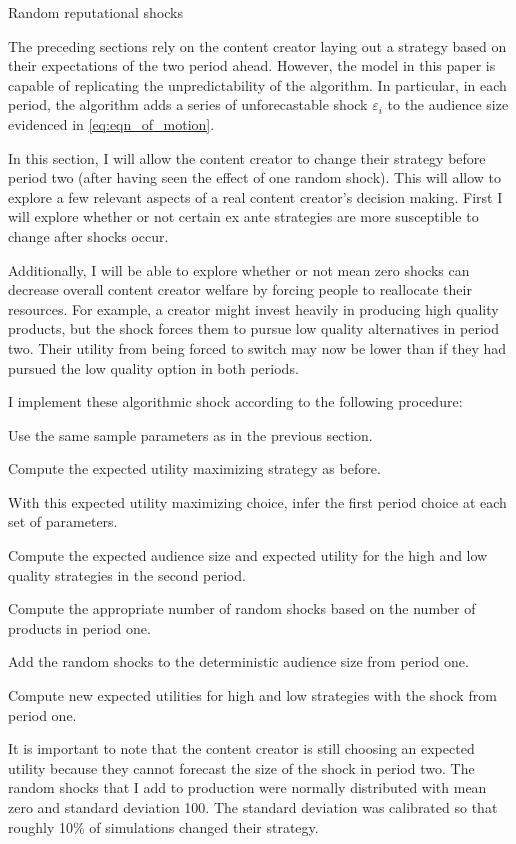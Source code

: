 \documentclass[
]{article}
\begin{document}
Random reputational shocks

The preceding sections rely on the content creator laying out a strategy
based on their expectations of the two period ahead. However, the model
in this paper is capable of replicating the unpredictability of the
algorithm. In particular, in each period, the algorithm adds a series of
unforecastable shock \(\varepsilon_i\) to the audience size evidenced in
\ref{eq:eqn_of_motion}.

In this section, I will allow the content creator to change their
strategy before period two (after having seen the effect of one random
shock). This will allow to explore a few relevant aspects of a real
content creator's decision making. First I will explore whether or not
certain ex ante strategies are more susceptible to change after shocks
occur.

Additionally, I will be able to explore whether or not mean zero shocks
can decrease overall content creator welfare by forcing people to
reallocate their resources. For example, a creator might invest heavily
in producing high quality products, but the shock forces them to pursue
low quality alternatives in period two. Their utility from being forced
to switch may now be lower than if they had pursued the low quality
option in both periods.

I implement these algorithmic shock according to the following
procedure:

Use the same sample parameters as in the previous section.

Compute the expected utility maximizing strategy as before.

With this expected utility maximizing choice, infer the first period
choice at each set of parameters.

Compute the expected audience size and expected utility for the high and
low quality strategies in the second period.

Compute the appropriate number of random shocks based on the number of
products in period one.

Add the random shocks to the deterministic audience size from period
one.

Compute new expected utilities for high and low strategies with the
shock from period one.

It is important to note that the content creator is still choosing an
expected utility because they cannot forecast the size of the shock in
period two. The random shocks that I add to production were normally
distributed with mean zero and standard deviation 100. The standard
deviation was calibrated so that roughly 10\% of simulations changed
their strategy.
\end{document}
